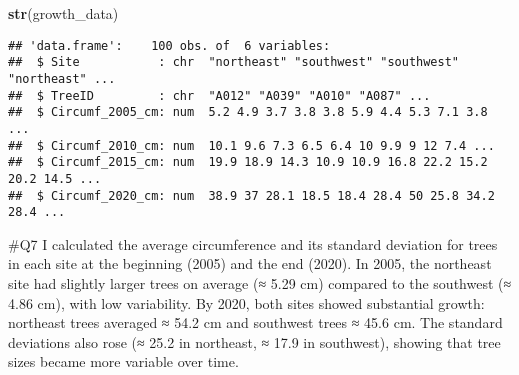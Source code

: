 \documentclass[
]{article}
\newenvironment{Shaded}{\begin{snugshade}}{\end{snugshade}}
\newcommand{\AttributeTok}[1]{\textcolor[rgb]{0.13,0.29,0.53}{#1}}
\newcommand{\CommentTok}[1]{\textcolor[rgb]{0.56,0.35,0.01}{\textit{#1}}}
\newcommand{\ConstantTok}[1]{\textcolor[rgb]{0.56,0.35,0.01}{#1}}
\newcommand{\FunctionTok}[1]{\textcolor[rgb]{0.13,0.29,0.53}{\textbf{#1}}}
\newcommand{\NormalTok}[1]{#1}
\newcommand{\OtherTok}[1]{\textcolor[rgb]{0.56,0.35,0.01}{#1}}
\newcommand{\SpecialCharTok}[1]{\textcolor[rgb]{0.81,0.36,0.00}{\textbf{#1}}}
\begin{document}
\begin{Shaded}
\begin{Highlighting}[]
\FunctionTok{str}\NormalTok{(growth\_data)}
\end{Highlighting}
\end{Shaded}

\begin{verbatim}
## 'data.frame':    100 obs. of  6 variables:
##  $ Site           : chr  "northeast" "southwest" "southwest" "northeast" ...
##  $ TreeID         : chr  "A012" "A039" "A010" "A087" ...
##  $ Circumf_2005_cm: num  5.2 4.9 3.7 3.8 3.8 5.9 4.4 5.3 7.1 3.8 ...
##  $ Circumf_2010_cm: num  10.1 9.6 7.3 6.5 6.4 10 9.9 9 12 7.4 ...
##  $ Circumf_2015_cm: num  19.9 18.9 14.3 10.9 10.9 16.8 22.2 15.2 20.2 14.5 ...
##  $ Circumf_2020_cm: num  38.9 37 28.1 18.5 18.4 28.4 50 25.8 34.2 28.4 ...
\end{verbatim}

\#Q7 I calculated the average circumference and its standard deviation
for trees in each site at the beginning (2005) and the end (2020). In
2005, the northeast site had slightly larger trees on average (≈ 5.29
cm) compared to the southwest (≈ 4.86 cm), with low variability. By
2020, both sites showed substantial growth: northeast trees averaged ≈
54.2 cm and southwest trees ≈ 45.6 cm. The standard deviations also rose
(≈ 25.2 in northeast, ≈ 17.9 in southwest), showing that tree sizes
became more variable over time.

\begin{Shaded}
\end{Shaded}
\end{document}
